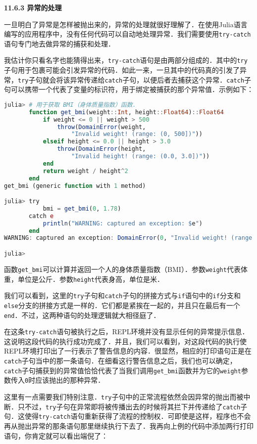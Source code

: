 \textbf{11.6.3 异常的处理}

一旦明白了异常是怎样被抛出来的，异常的处理就很好理解了．在使用Julia语言编写的应用程序中，没有任何代码可以自动地处理异常．我们需要使用\verb|try-catch|语句专门地去做异常的捕获和处理．

我估计你只看名字也能猜得出来，\verb|try-catch|语句是由两部分组成的．其中的\verb|try|子句用于包裹可能会引发异常的代码．如此一来，一旦其中的代码真的引发了异常，\verb|try|子句就会将该异常传递给\verb|catch|子句，以便后者去捕获这个异常．\verb|catch|子句可以携带一个代表了变量的标识符，用于绑定被捕获的那个异常值．示例如下：

\begin{lstlisting}[language=julia]
julia> # 用于获取 BMI（身体质量指数）函数．
       function get_bmi(weight::Int, height::Float64)::Float64
           if weight <= 0 || weight > 500
               throw(DomainError(weight, 
                   "Invalid weight! (range: (0, 500])"))
           elseif height <= 0.0 || height > 3.0
               throw(DomainError(height, 
                   "Invalid height! (range: (0.0, 3.0])"))
           end
           return weight / height^2
       end
get_bmi (generic function with 1 method)

julia> try 
           bmi = get_bmi(0, 1.78)
       catch e
           println("WARNING: captured an exception: $e")
       end
WARNING: captured an exception: DomainError(0, "Invalid weight! (range: (0, 500])")

julia> 
\end{lstlisting}

函数\verb|get_bmi|可以计算并返回一个人的身体质量指数（BMI）．参数\verb|weight|代表体重，单位是公斤．参数\verb|height|代表身高，单位是米．

我们可以看到，这里的\verb|try|子句和\verb|catch|子句的拼接方式与\verb|if|语句中的\verb|if|分支和\verb|else|分支的拼接方式是一样的．它们都是紧挨在一起的，并且只在最后有一个\verb|end|．不过，这两种语句的处理逻辑就大相径庭了．

在这条\verb|try-catch|语句被执行之后，REPL环境并没有显示任何的异常提示信息．这说明这段代码的执行成功完成了．并且，我们可以看到，对这段代码的执行使REPL环境打印出了一行表示了警告信息的内容．很显然，相应的打印语句正是在\verb|catch|子句当中的那一条语句．在细看这行警告信息之后，我们也可以确定，\verb|catch|子句捕获到的异常值恰恰代表了当我们调用\verb|get_bmi|函数并为它的\verb|weight|参数传入\verb|0|时应该抛出的那种异常．

这里有一点需要我们特别注意．\verb|try|子句中的正常流程依然会因异常的抛出而被中断．只不过，\verb|try|子句在异常即将被传播出去的时候将其拦下并传递给了\verb|catch|子句．这使得\verb|try-catch|语句重新获得了流程的控制权．可即使是这样，程序也不会再从抛出异常的那条语句那里继续执行下去了．我再向上例的代码中添加两行打印语句，你肯定就可以看出端倪了：

